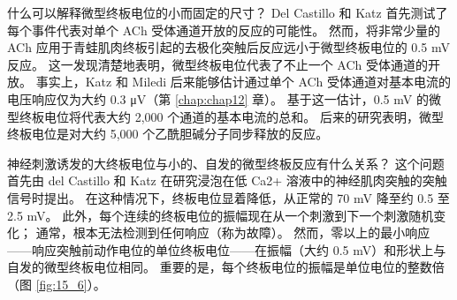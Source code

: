 什么可以解释微型终板电位的小而固定的尺寸？ 
Del Castillo 和 Katz 首先测试了每个事件代表对单个 ACh 受体通道开放的反应的可能性。 
然而，将非常少量的 ACh 应用于青蛙肌肉终板引起的去极化突触后反应远小于微型终板电位的 0.5 mV 反应。 
这一发现清楚地表明，微型终板电位代表了不止一个 ACh 受体通道的开放。 
事实上，Katz 和 Miledi 后来能够估计通过单个 ACh 受体通道对基本电流的电压响应仅为大约 0.3 μV（第 \ref{chap:chap12} 章）。 
基于这一估计，0.5 mV 的微型终板电位将代表大约 2,000 个通道的基本电流的总和。 后来的研究表明，微型终板电位是对大约 5,000 个乙酰胆碱分子同步释放的反应。


神经刺激诱发的大终板电位与小的、自发的微型终板反应有什么关系？ 
这个问题首先由 del Castillo 和 Katz 在研究浸泡在低 Ca2+ 溶液中的神经肌肉突触的突触信号时提出。 
在这种情况下，终板电位显着降低，从正常的 70 mV 降至约 0.5 至 2.5 mV。 
此外，每个连续的终板电位的振幅现在从一个刺激到下一个刺激随机变化； 
通常，根本无法检测到任何响应（称为故障）。 
然而，零以上的最小响应——响应突触前动作电位的单位终板电位——在振幅（大约 0.5 mV）和形状上与自发的微型终板电位相同。 
重要的是，每个终板电位的振幅是单位电位的整数倍（图 \ref{fig:15_6}）。

